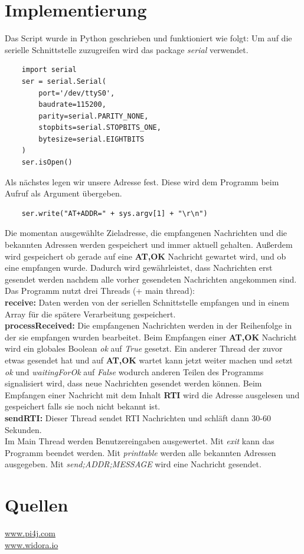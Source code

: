 \documentclass[12pt, a4paper]{article}
\begin{document}
\section{Implementierung}
Das Script wurde in Python geschrieben und funktioniert wie folgt:
Um auf die serielle Schnittstelle zuzugreifen wird das package \textit{serial}
verwendet.
\begin{lstlisting}
    import serial
    ser = serial.Serial(
        port='/dev/ttyS0',
        baudrate=115200,
        parity=serial.PARITY_NONE,
        stopbits=serial.STOPBITS_ONE,
        bytesize=serial.EIGHTBITS
    )
    ser.isOpen()
\end{lstlisting} 
Als nächstes legen wir unsere Adresse fest. Diese wird dem Programm beim
Aufruf als Argument übergeben.
\begin{lstlisting}
    ser.write("AT+ADDR=" + sys.argv[1] + "\r\n")
\end{lstlisting}
Die momentan ausgewählte Zieladresse, die empfangenen Nachrichten und
die bekannten Adressen werden gespeichert und immer aktuell gehalten.
Außerdem wird gespeichert ob gerade auf eine \textbf{AT,OK} Nachricht gewartet wird,
und ob eine empfangen wurde. Dadurch wird gewährleistet, dass Nachrichten 
erst gesendet werden nachdem alle vorher gesendeten Nachrichten angekommen sind.
Das Programm nutzt drei Threads (+ main thread): \\
\textbf{receive:} 
Daten werden von der seriellen Schnittstelle empfangen und in einem Array 
für die spätere Verarbeitung gespeichert. \\
\textbf{processReceived:} 
Die empfangenen Nachrichten werden in der Reihenfolge in der sie 
empfangen wurden bearbeitet. Beim Empfangen einer \textbf{AT,OK}
Nachricht wird ein globales Boolean \textit{ok} auf \textit{True} gesetzt.
Ein anderer Thread der zuvor etwas gesendet hat und auf \textbf{AT,OK}
wartet kann jetzt weiter machen und setzt \textit{ok} und \textit{waitingForOk}
auf \textit{False} wodurch anderen Teilen des Programms signalisiert 
wird, dass neue Nachrichten gesendet werden können.
Beim Empfangen einer Nachricht mit dem Inhalt \textbf{RTI} wird die Adresse
ausgelesen und gespeichert falls sie noch nicht bekannt ist. \\
\textbf{sendRTI:}
Dieser Thread sendet RTI Nachrichten und schläft dann 30-60 Sekunden. \\
Im Main Thread werden Benutzereingaben ausgewertet. Mit \textit{exit} kann das
Programm beendet werden. Mit \textit{printtable} werden alle bekannten Adressen 
ausgegeben. Mit \textit{send;ADDR;MESSAGE} wird eine Nachricht gesendet.

\section{Quellen}
\hyperlink{http://www.pi4j.com}{www.pi4j.com} \\
\hyperlink{https://www.widora.io/zh/ting_at}{www.widora.io}
\end{document}
